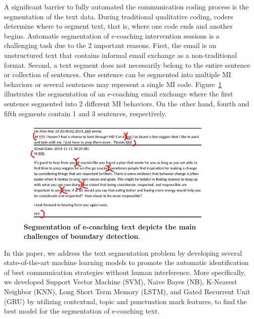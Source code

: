 \documentclass{amia}
\begin{document}
A significant barrier to fully automated the communication coding process is the segmentation of the text data. During traditional qualitative coding, coders determine where to segment text, that is, where one code ends and another begins. Automatic segmentation of e-coaching intervention sessions is a challenging task due to the 2 important reasons. First, the email is an unstructured text that contains informal email exchange as a non-traditional format. Second, a text segment does not necessarily belong to the entire sentence or collection of sentences. One sentence can be segmented into multiple MI behaviors or several sentences may represent a single MI code. Figure~\ref{fig:text-segment} illustrates the segmentation of an e-coaching email exchange where the first sentence segmented into 2 different MI behaviors. On the other hand, fourth and fifth segments contain 1 and 3 sentences, respectively.  

\begin{figure}[!htb]
    \centering
    \includegraphics[width=0.9\textwidth]{figures/segment-example.png}
    \caption{\textbf{Segmentation of e-coaching text depicts the main challenges of boundary detection}.}
    \label{fig:text-segment}
\end{figure}

In this paper, we address the text segmentation problem by developing several state-of-the-art machine learning models to promote the automatic identification of best communication strategies without human interference. More specifically, we developed Support Vector Machine (SVM), Naive Bayes (NB), K-Nearest Neighbor (KNN), Long Short Term Memory (LSTM), and Gated Recurrent Unit (GRU) by utilizing contextual, topic and punctuation mark features, to find the best model for the segmentation of e-coaching text. 
\end{document}
